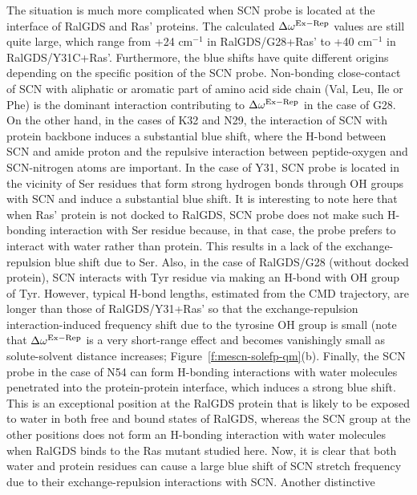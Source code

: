 \documentclass[a4paper,titlepage,twoside,fleqn,12pt]{book}
\begin{document}
\begin{refsection}
The situation is much more complicated when SCN probe is
located at the interface of RalGDS and Ras' proteins. 
The calculated $\Delta\omega^{\rm Ex-Rep}$ values are still quite large, which
range from +24 cm$^{-1}$ in RalGDS/G28+Ras' to +40 cm$^{-1}$ in
RalGDS/Y31C+Ras'. Furthermore, the blue shifts have quite
different origins depending on the specific position of the SCN
probe. Non\hyp{}bonding close\hyp{}contact of SCN with aliphatic or
aromatic part of amino acid side chain (Val, Leu, Ile or Phe) is
the dominant interaction contributing to $\Delta\omega^{\rm Ex-Rep}$ in the case of
G28. On the other hand, in the cases of K32 and N29, the
interaction of SCN with protein backbone induces a substantial
blue shift, where the H-bond between SCN and amide proton
and the repulsive interaction between peptide\hyp{}oxygen and
SCN-nitrogen atoms are important. In the case of Y31, SCN
probe is located in the vicinity of Ser residues that form strong
hydrogen bonds through OH groups with SCN and induce a
substantial blue shift. It is interesting to note here that when
Ras' protein is not docked to RalGDS, SCN probe does not
make such H-bonding interaction with Ser residue because, in
that case, the probe prefers to interact with water rather than
protein. This results in a lack of the exchange\hyp{}repulsion blue
shift due to Ser. Also, in the case of RalGDS/G28 (without
docked protein), SCN interacts with Tyr residue via making an
H-bond with OH group of Tyr. However, typical H-bond
lengths, estimated from the CMD trajectory, are longer than
those of RalGDS/Y31+Ras' so that the exchange-repulsion
interaction\hyp{}induced frequency shift due to the tyrosine OH
group is small (note that $\Delta\omega^{\rm Ex-Rep}$ is a very short\hyp{}range effect
and becomes vanishingly small as solute\hyp{}solvent distance
increases; Figure~\ref{f:mescn-solefp-qm}(b). %
Finally, the SCN probe in the case of
N54 can form H-bonding interactions with water molecules
penetrated into the protein-protein interface, which induces a
strong blue shift. This is an exceptional position at the RalGDS
protein that is likely to be exposed to water in both free and
bound states of RalGDS, whereas the SCN group at the other
positions does not form an H-bonding interaction with water
molecules when RalGDS binds to the Ras mutant studied here.
Now, it is clear that both water and protein residues can cause
a large blue shift of SCN stretch frequency due to their
exchange\hyp{}repulsion interactions with SCN. Another distinctive

\end{refsection}
\end{document}

